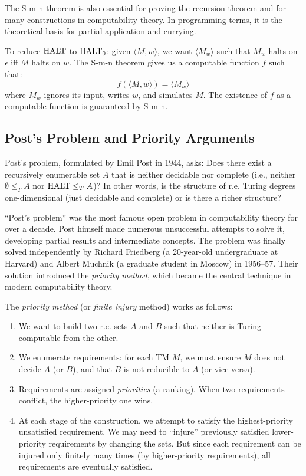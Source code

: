 The S-m-n theorem is also essential for proving the recursion theorem and for many constructions in computability theory. In programming terms, it is the theoretical basis for partial application and currying.

\begin{example}
To reduce $\text{HALT}$ to $\text{HALT}_0$: given $\langle M, w \rangle$, we want $\langle M_w \rangle$ such that $M_w$ halts on $\epsilon$ iff $M$ halts on $w$. The S-m-n theorem gives us a computable function $f$ such that:
\[
f(\langle M, w \rangle) = \langle M_w \rangle
\]
where $M_w$ ignores its input, writes $w$, and simulates $M$. The existence of $f$ as a computable function is guaranteed by S-m-n.
\end{example}

\subsection*{Post's Problem and Priority Arguments}

Post's problem, formulated by Emil Post in 1944, asks: Does there exist a recursively enumerable set $A$ that is neither decidable nor complete (i.e., neither $\emptyset \le_T A$ nor $\text{HALT} \le_T A$)? In other words, is the structure of r.e. Turing degrees one-dimensional (just decidable and complete) or is there a richer structure?

``Post's problem'' was the most famous open problem in computability theory for over a decade. Post himself made numerous unsuccessful attempts to solve it, developing partial results and intermediate concepts. The problem was finally solved independently by Richard Friedberg (a 20-year-old undergraduate at Harvard) and Albert Muchnik (a graduate student in Moscow) in 1956--57. Their solution introduced the \emph{priority method}, which became the central technique in modern computability theory.

The \emph{priority method} (or \emph{finite injury} method) works as follows:

\begin{enumerate}
\item We want to build two r.e. sets $A$ and $B$ such that neither is Turing-computable from the other.
\item We enumerate requirements: for each TM $M$, we must ensure $M$ does not decide $A$ (or $B$), and that $B$ is not reducible to $A$ (or vice versa).
\item Requirements are assigned \emph{priorities} (a ranking). When two requirements conflict, the higher-priority one wins.
\item At each stage of the construction, we attempt to satisfy the highest-priority unsatisfied requirement. We may need to ``injure'' previously satisfied lower-priority requirements by changing the sets. But since each requirement can be injured only finitely many times (by higher-priority requirements), all requirements are eventually satisfied.
\end{enumerate}

